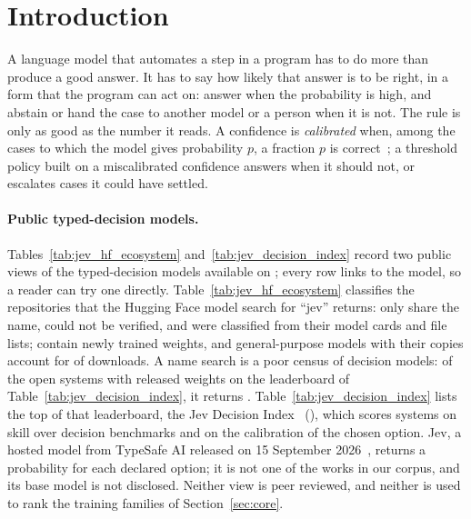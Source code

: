\section{Introduction}
\label{sec:intro}

A language model that automates a step in a program has to do more than produce a good answer. It has
to say how likely that answer is to be right, in a form that the program can act on: answer when the
probability is high, and abstain or hand the case to another model or a person when it is not. The rule
is only as good as the number it reads. A confidence is \emph{calibrated} when, among the cases to which
the model gives probability $p$, a fraction $p$ is correct~\citep{guo2017calibration}; a threshold
policy built on a miscalibrated confidence answers when it should not, or escalates cases it could have
settled.




\paragraph{Public typed-decision models.} Tables~\ref{tab:jev_hf_ecosystem} and~\ref{tab:jev_decision_index} record
two public views of the typed-decision models available on \diDate; every row links to the model, so a reader
can try one directly. Table~\ref{tab:jev_hf_ecosystem} classifies the \nHF repositories that the
Hugging Face model search for ``jev'' returns: \nHFNameOnly only share the name, \nHFUnverified could not be
verified, and \nHFClassified were classified from their model cards and file lists; \nHFTrained contain newly
trained weights, and general-purpose models with their copies account for \nHFGeneralPct of downloads. A name
search is a poor census of decision models: of the \nDIOpenWeights open systems with released weights on the
leaderboard of Table~\ref{tab:jev_decision_index}, it returns \nDIFoundByName. Table~\ref{tab:jev_decision_index}
lists the top of that leaderboard, the Jev Decision Index~\citep{multimodalart2026jevdi} (\diRelease), which
scores \nDISystems systems on skill over \nDIBench decision benchmarks and on the calibration of the chosen
option. Jev, a hosted model from TypeSafe AI released on 15 September 2026~\citep{almeida2026introducing},
returns a probability for each declared option; it is not one of the \nWorks works in our corpus, and its
base model is not disclosed. Neither view is peer reviewed, and neither is used to rank the training
families of Section~\ref{sec:core}.


